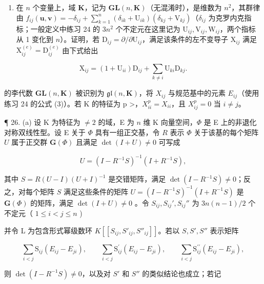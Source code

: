 \begin{enumerate}
\def\labelenumi{\arabic{enumi}.}
\setcounter{enumi}{24}
\tightlist
\item
  在 \(n\) 个变量上，域 \(\mathbf{K}\)，记为 \(\mathbf{GL}(n, \mathbf{K})\)（无混淆时），是维数为 \(n^2\)，其群律由 \(f_{ij}(\mathbf{u}, \mathbf{v}) = -\delta_{ij} + \sum_{k=1}^{n} (\delta_{ik} + \mathrm{U}_{ik})(\delta_{kj} + \mathrm{V}_{kj})\)（\(\delta_{ij}\) 为克罗内克指标；一般定义中练习 24 的 \(3n^2\) 个不定元在这里记为 \(\mathrm{U}_{ij}, \mathrm{V}_{ij}, \mathrm{W}_{ij}\)，两个指标从 1 变化到 \(n\)）。证明，若 \(\mathrm{D}_{ij} = \partial/\partial \mathrm{U}_{ij}\)，满足该条件的左不变导子 \(\mathrm{X}_{ij}\) 满足 \(\mathrm{X}_{ij}^{(e)} = \mathrm{D}_{ij}^{(e)}\) 由下式给出
\end{enumerate}

\[
\mathrm{X} _ {i j} = (1 + \mathrm{U} _ {i i}) \mathrm{D} _ {i j} + \sum_ {k \neq i} \mathrm{U} _ {k i} \mathrm{D} _ {k j}.
\]

 的李代数 \(\mathbf{GL}(n,\mathbf{K})\) 被识别为 \(\mathfrak{gl}(n,\mathbf{K})\)，将 \(X_{ij}\) 与规范基中的元素 \(E_{ij}\)（使用练习 24 的公式 (3)）。若 K 的特征为 p \textgreater{}，\(X_{ii}^{p} = X_{ii}\)，且 \(X_{ij}^{p} = 0\) 当 \(i \neq j\)。

¶ 26. (a) 设 K 为特征为 \(\neq 2\)  的域，E 为 \(n\)  维 K 向量空间，\(\Phi\) 是 E 上的非退化对称双线性型。设 E 关于 \(\Phi\) 具有一组正交基，令 \(R\) 表示 \(\Phi\) 关于该基的每个矩阵 \(U\) 属于正交群 \(\mathbf{G}(\Phi)\) 且满足 \(\det(I + U) \neq 0\) 可写成

\[
U = (I - R ^ {- 1} S) ^ {- 1} (I + R ^ {- 1} S),
\]

  其中 \(S = R(U - I)(U + I)^{-1}\) 是交错矩阵，满足 \(\det(I - R^{-1}S) \neq 0\)；反之，对每个矩阵 \(S\) 满足这些条件的矩阵 \(U = (I - R^{-1}S)^{-1}(I + R^{-1}S)\) 是 \(\mathbf{G}(\Phi)\) 的矩阵，满足 \(\det(I + U) \neq 0\) 。令 \(S_{ij}, S_{ij}', S_{ij}''\) 为 \(3n(n - 1)/2\) 个不定元（ \(1 \leqslant i < j \leqslant n\) )

并令 L 为包含形式幂级数环 \(K[[S_{ij}, S'_{ij}, S''_{ij}]]\)。若以 \(S, S', S''\) 表示矩阵

\[
\sum_ {i <   j} \mathrm{S} _ {i j} (E _ {i j} - E _ {j i}), \qquad \sum_ {i <   j} \mathrm{S} _ {i j} ^ {\prime} (E _ {i j} - E _ {j i}), \qquad \sum_ {i <   j} \mathrm{S} _ {i j} ^ {\prime \prime} (E _ {i j} - E _ {j i}),
\]

则 \(\operatorname{det}(I - R^{-1}S) \neq 0\)，以及对 \(S'\) 和 \(S''\) 的类似结论也成立；若记

